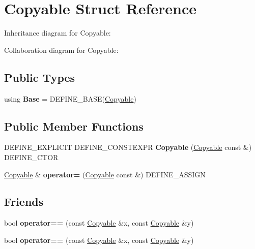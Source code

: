 \hypertarget{class_copyable}{}\section{Copyable Struct Reference}
\label{class_copyable}


Inheritance diagram for Copyable\+:


Collaboration diagram for Copyable\+:
\subsection*{Public Types}
\begin{DoxyCompactItemize}
\item 
\mbox{\label{class_copyable_a5925b6bb3709b2e172aa56a44a428adc}} 
using {\bfseries Base} = D\+E\+F\+I\+N\+E\+\_\+\+B\+A\+SE(\mbox{\hyperlink{class_copyable}{Copyable}})
\end{DoxyCompactItemize}
\subsection*{Public Member Functions}
\begin{DoxyCompactItemize}
\item 
\mbox{\label{class_copyable_a8a53e4d8cea6af012a057b358946a685}} 
D\+E\+F\+I\+N\+E\+\_\+\+E\+X\+P\+L\+I\+C\+IT D\+E\+F\+I\+N\+E\+\_\+\+C\+O\+N\+S\+T\+E\+X\+PR {\bfseries Copyable} (\mbox{\hyperlink{class_copyable}{Copyable}} const \&) D\+E\+F\+I\+N\+E\+\_\+\+C\+T\+OR
\item 
\mbox{\label{class_copyable_aa95cb75e49fedbcdd5e01b9e37f25da5}} 
\mbox{\hyperlink{class_copyable}{Copyable}} \& {\bfseries operator=} (\mbox{\hyperlink{class_copyable}{Copyable}} const \&) D\+E\+F\+I\+N\+E\+\_\+\+A\+S\+S\+I\+GN
\end{DoxyCompactItemize}
\subsection*{Friends}
\begin{DoxyCompactItemize}
\item 
\mbox{\label{class_copyable_a96cc8971cae13a1a957b1f06718925ca}} 
bool {\bfseries operator==} (const \mbox{\hyperlink{class_copyable}{Copyable}} \&x, const \mbox{\hyperlink{class_copyable}{Copyable}} \&y)
\item 
\mbox{\label{class_copyable_a96cc8971cae13a1a957b1f06718925ca}} 
bool {\bfseries operator==} (const \mbox{\hyperlink{class_copyable}{Copyable}} \&x, const \mbox{\hyperlink{class_copyable}{Copyable}} \&y)
\end{DoxyCompactItemize}


